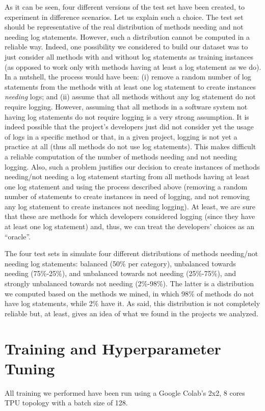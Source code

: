 As it can be seen, four different versions of the test set have been created, to experiment \approach in difference scenarios. Let us explain such a choice. The test set should be representative of the real distribution of \java methods needing and not needing log statements. However, such a distribution cannot be computed in a reliable way. Indeed, one possibility we considered to build our dataset was to just consider all methods with and without log statements as training instances (as opposed to work only with methods having at least a log statement as we do). In a nutshell, the process would have been: (i) remove a random number of log statements from the methods with at least one log statement to create instances \emph{needing} logs; and (ii) assume that all methods without any log statement do not require logging. However, assuming that all methods in a software system not having log statements do not require logging is a very strong assumption. It is indeed possible that the project's developers just did not consider yet the usage of logs in a specific method or that, in a given project, logging is not yet a practice at all (thus all methods do not use log statements). This makes difficult a reliable computation of the number of methods needing and not needing logging. Also, such a problem justifies our decision to create  instances of methods needing/not needing a log statement starting from all methods having at least one log statement and using the process described above (\ie removing a random number of statements to create instances in need of logging, and not removing any log statement to create instances not needing logging). At least, we are sure that these are methods for which developers considered logging (since they have at least one log statement) and, thus, we can treat the developers' choices as an ``oracle''. 

The four test sets in  simulate four different distributions of methods needing/not needing log statements: balanced (50\% per category), unbalanced towards needing (75\%-25\%), and unbalanced towards not needing (25\%-75\%), and strongly unbalanced towards not needing (2\%-98\%). The latter is a distribution we computed based on the methods we mined, in which 98\% of methods do not have log statements, while 2\% have it. As said, this distribution is not completely reliable but, at least, gives an idea of what we found in the projects we analyzed.



\section{Training and Hyperparameter Tuning} \label{sec:training}
All training we performed have been run using a Google Colab's 2x2, 8 cores TPU topology with a batch size of 128.

